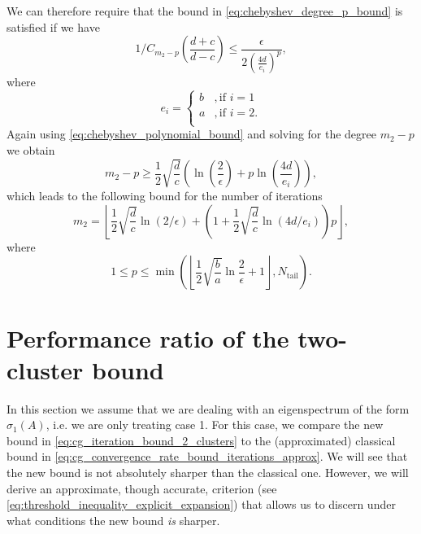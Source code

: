 We can therefore require that the bound in \cref{eq:chebyshev_degree_p_bound} is satisfied if we have
\[
    1/C_{m_2-p}\left(\frac{d+c}{d-c}\right) \leq \frac{\epsilon}{2\left( \frac{4d}{e_i}\right)^p},
\]
where
\[
    e_i = \begin{cases}
        b & , \text{if } i = 1  \\
        a & , \text{if } i = 2. \\
    \end{cases}
\]
Again using \cref{eq:chebyshev_polynomial_bound} and solving for the degree $m_2 - p$ we obtain
\[
    m_2 - p \geq \frac{1}{2}\sqrt{\frac{d}{c}}\left(\ln\left(\frac{2}{\epsilon}\right) + p \ln\left(\frac{4d}{e_i}\right)\right),
\]
which leads to the following bound for the number of iterations \cite[Equation 4.4]{cg_sharpened_convrate_Axelsson1976}
\begin{equation}
    m_2=\left\lfloor\frac{1}{2} \sqrt{\frac{d}{c}} \ln (2 / \epsilon)+\left(1+\frac{1}{2} \sqrt{\frac{d}{c}} \ln (4 d / e_i)\right) p\right\rfloor,
    \label{eq:cg_iteration_bound_2_clusters}
\end{equation}
where
\[
    1 \leq p \leq \min\left(\left\lfloor\frac{1}{2}\sqrt{\frac{b}{a}}\ln{\frac{2}{\epsilon}} + 1 \right\rfloor, N_{\text{tail}}\right).
\]

\section{Performance ratio of the two-cluster bound}\label{sec:performance_ratio}
In this section we assume that we are dealing with an eigenspectrum of the form $\sigma_1(A)$, i.e. we are only treating case 1. For this case, we compare the new bound in \cref{eq:cg_iteration_bound_2_clusters} to the (approximated) classical bound in \cref{eq:cg_convergence_rate_bound_iterations_approx}. We will see that the new bound is not absolutely sharper than the classical one. However, we will derive an approximate, though accurate, criterion (see \cref{eq:threshold_inequality_explicit_expansion}) that allows us to discern under what conditions the new bound \textit{is} sharper.

